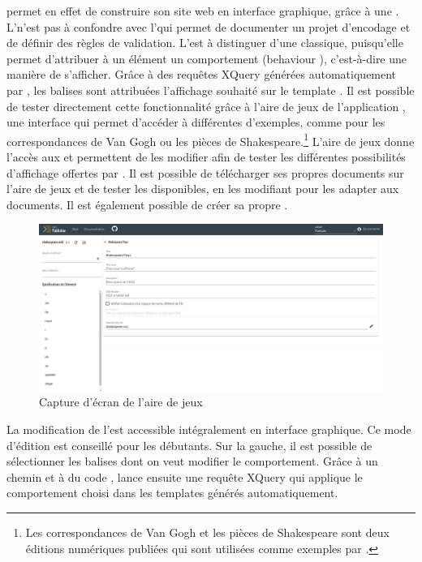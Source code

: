\tp permet en effet de construire son site web en interface graphique, grâce à une \ODD. L'\ODD \tp n'est pas à confondre avec l'\ODD qui permet de documenter un projet d'encodage et de définir des règles de validation. L'\ODD \tp est à distinguer d'une \ODD classique, puisqu'elle permet d'attribuer à un élément un comportement (\og behaviour \fg), c'est-à-dire une manière de s'afficher. Grâce à des requêtes XQuery générées automatiquement par \tp, les balises \TEI sont attribuées l'affichage souhaité sur le template \HTML. Il est possible de tester directement cette fonctionnalité grâce à l'aire de jeux de l'application \tp, une interface qui permet d'accéder à différentes \ODD d'exemples, comme pour les correspondances de Van Gogh ou les pièces de Shakespeare.\footnote{Les correspondances de Van Gogh et les pièces de Shakespeare sont deux éditions numériques publiées qui sont utilisées comme exemples par \tp.} L'aire de jeux donne l'accès aux \ODD et permettent de les modifier afin de tester les différentes possibilités d'affichage offertes par \tp. Il est possible de télécharger ses propres documents sur l'aire de jeux et de tester les \ODD disponibles, en les modifiant pour les adapter aux documents. Il est également possible de créer sa propre \ODD.

\begin{figure}[h]
    \centering
    \includegraphics[width=\textwidth]{images/playground.png}
    \caption{Capture d'écran de l'aire de jeux \tp}
\end{figure}

La modification de l'\ODD est accessible intégralement en interface graphique. Ce mode d'édition est conseillé pour les débutants. Sur la gauche, il est possible de sélectionner les balises dont on veut modifier le comportement. Grâce à un chemin \xpath et à du code \CSS, \tp lance ensuite une requête XQuery qui applique le comportement choisi dans les templates \HTML générés automatiquement. 

